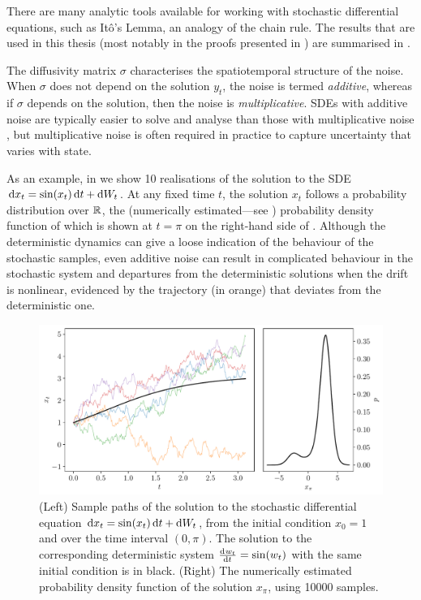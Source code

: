 There are many analytic tools available for working with stochastic differential equations, such as It\^o's Lemma, an analogy of the chain rule.
The results that are used in this thesis (most notably in the proofs presented in ) are summarised in .

The diffusivity matrix \(\sigma\) characterises the spatiotemporal structure of the noise.
When \(\sigma\) does not depend on the solution \(y_t\), the noise is termed \emph{additive}, whereas if \(\sigma\) depends on the solution, then the noise is \emph{multiplicative}.
SDEs with additive noise are typically easier to solve and analyse than those with multiplicative noise \citep{SanchoEtAl_1982_AnalyticalNumericalStudies}, but multiplicative noise is often required in practice to capture uncertainty that varies with state.

As an example, in  we show 10 realisations of the solution to the SDE \(\dif x_t = \sin\!\left(x_t\right)\dif t + \dif W_t\).
At any fixed time \(t\), the solution \(x_t\) follows a probability distribution over \(\mathbb{R}\), the (numerically estimated---see ) probability density function of which is shown at \(t = \pi\) on the right-hand side of .
Although the deterministic dynamics can give a loose indication of the behaviour of the stochastic samples, even additive noise can result in complicated behaviour in the stochastic system and departures from the deterministic solutions when the drift is nonlinear, evidenced by the trajectory (in orange) that deviates from the deterministic one.

\begin{figure}[t]
	\centering
	\includegraphics[width=\textwidth]{chp02_background/figures/ou_solution.pdf}
	\caption{(Left) Sample paths of the solution to the stochastic differential equation \(\dif x_t = \sin\!\left(x_t\right)\dif t + \dif W_t\), from the initial condition \(x_0 = 1\) and over the time interval \((0,\pi)\).
		The solution to the corresponding deterministic system \(\od{w_t}{t} = \sin\!\left(w_t\right)\) with the same initial condition is in black.
		(Right) The numerically estimated probability density function of the solution \(x_\pi\), using 10000 samples.}
	\label{fig:sde_sol_sample}
\end{figure}


